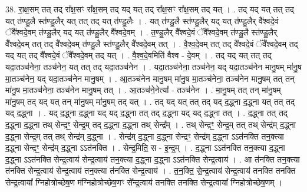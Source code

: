 \documentclass[17pt]{extarticle}
\begin{document}
38. रा॒क्ष॒सम् तत् तद् रा᳚क्ष॒सꣳ रा᳚क्ष॒सम् तद् यद् यत् तद् रा᳚क्ष॒सꣳ रा᳚क्ष॒सम् तद् यत् । . तद् यद् यत् तत् तद् यत् त॑ण्डु॒लै स्त॑ण्डु॒लैर् यत् तत् तद् यत् त॑ण्डु॒लैः । . यत् त॑ण्डु॒लै स्त॑ण्डु॒लैर् यद् यत् त॑ण्डु॒लैर् वै᳚श्वदे॒वं ॅवै᳚श्वदे॒वम् त॑ण्डु॒लैर् यद् यत् त॑ण्डु॒लैर् वै᳚श्वदे॒वम् । . त॒ण्डु॒लैर् वै᳚श्वदे॒वं ॅवै᳚श्वदे॒वम् त॑ण्डु॒लै स्त॑ण्डु॒लैर् वै᳚श्वदे॒वम् तत् तद् वै᳚श्वदे॒वम् त॑ण्डु॒लै स्त॑ण्डु॒लैर् वै᳚श्वदे॒वम् तत् । . वै॒श्व॒दे॒वम् तत् तद् वै᳚श्वदे॒वं ॅवै᳚श्वदे॒वम् तद् यद् यत् तद् वै᳚श्वदे॒वं ॅवै᳚श्वदे॒वम् तद् यत् । . वै॒श्व॒दे॒वमिति॑ वैश्व - दे॒वम् । . तद् यद् यत् तत् तद् यदा॒तञ्च॑नेना॒ तञ्च॑नेन॒ यत् तत् तद् यदा॒तञ्च॑नेन । . यदा॒तञ्च॑नेना॒ तञ्च॑नेन॒ यद् यदा॒तञ्च॑नेन मानु॒षम् मा॑नु॒ष मा॒तञ्च॑नेन॒ यद् यदा॒तञ्च॑नेन मानु॒षम् । . आ॒तञ्च॑नेन मानु॒षम् मा॑नु॒ष मा॒तञ्च॑नेना॒ तञ्च॑नेन मानु॒षम् तत् तन् मा॑नु॒ष मा॒तञ्च॑नेना॒ तञ्च॑नेन मानु॒षम् तत् । . आ॒तञ्च॑ने॒नेत्या᳚ - तञ्च॑नेन । . मा॒नु॒षम् तत् तन् मा॑नु॒षम् मा॑नु॒षम् तद् यद् यत् तन् मा॑नु॒षम् मा॑नु॒षम् तद् यत् । . तद् यद् यत् तत् तद् यद् द॒द्ध्ना द॒द्ध्ना यत् तत् तद् यद् द॒द्ध्ना । . यद् द॒द्ध्ना द॒द्ध्ना यद् यद् द॒द्ध्ना तत् तद् द॒द्ध्ना यद् यद् द॒द्ध्ना तत् । . द॒द्ध्ना तत् तद् द॒द्ध्ना द॒द्ध्ना तथ् सेन्द्रꣳ॒॒ सेन्द्र॒म् तद् द॒द्ध्ना द॒द्ध्ना तथ् सेन्द्र᳚म् । . तथ् सेन्द्रꣳ॒॒ सेन्द्र॒म् तत् तथ् सेन्द्र॑म् द॒द्ध्ना द॒द्ध्ना सेन्द्र॒म् तत् तथ् सेन्द्र॑म् द॒द्ध्ना । . सेन्द्र॑म् द॒द्ध्ना द॒द्ध्ना सेन्द्रꣳ॒॒ सेन्द्र॑म् द॒द्ध्ना ऽऽत॑नक्ति तन॒क्त्या द॒द्ध्ना सेन्द्रꣳ॒॒ सेन्द्र॑म् द॒द्ध्ना ऽऽत॑नक्ति । . सेन्द्र॒मिति॒ स - इ॒न्द्र॒म् । . द॒द्ध्ना ऽऽत॑नक्ति तन॒क्त्या द॒द्ध्ना द॒द्ध्ना ऽऽत॑नक्ति सेन्द्र॒त्वाय॑ सेन्द्र॒त्वाय॑ तन॒क्त्या द॒द्ध्ना द॒द्ध्ना ऽऽत॑नक्ति सेन्द्र॒त्वाय॑ । . आ त॑नक्ति तन॒क्त्या त॑नक्ति सेन्द्र॒त्वाय॑ सेन्द्र॒त्वाय॑ तन॒क्त्या त॑नक्ति सेन्द्र॒त्वाय॑ । . त॒न॒क्ति॒ से॒न्द्र॒त्वाय॑ सेन्द्र॒त्वाय॑ तनक्ति तनक्ति सेन्द्र॒त्वाया᳚ ग्निहोत्रोच्छेष॒ण म॑ग्निहोत्रोच्छेष॒णꣳ से᳚न्द्र॒त्वाय॑ तनक्ति तनक्ति सेन्द्र॒त्वाया᳚ ग्निहोत्रोच्छेष॒णम् । \newline
\pagebreak
{}
\end{document}
